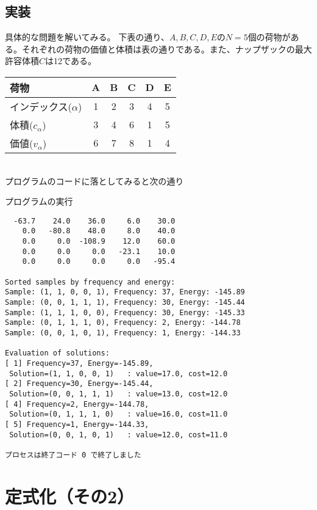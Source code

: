 \documentclass[uplatex,dvipdfmx,a4paper,11pt,oneside,openany]{jsbook}
\begin{document}
\subsection{実装}

具体的な問題を解いてみる。
下表の通り、$A,B,C,D,E$の$N=5$個の荷物がある。それぞれの荷物の価値と体積は表の通りである。また、ナップザックの最大許容体積$C$は12である。\\

\begin{tabular}{|l|ccccc|}\hline
  荷物 & A & B & C & D & E \\\hline
  インデックス($\alpha$) & 1 & 2 & 3 & 4 & 5 \\\hline
  体積($c_\alpha$) & 3 & 4 & 6 & 1 & 5 \\\hline
  価値($v_\alpha$) & 6 & 7 & 8 & 1 & 4 \\\hline
\end{tabular}\\

プログラムのコードに落としてみると次の通り



プログラムの実行

\begin{verbatim}
  -63.7    24.0    36.0     6.0    30.0
    0.0   -80.8    48.0     8.0    40.0
    0.0     0.0  -108.9    12.0    60.0
    0.0     0.0     0.0   -23.1    10.0
    0.0     0.0     0.0     0.0   -95.4

Sorted samples by frequency and energy:
Sample: (1, 1, 0, 0, 1), Frequency: 37, Energy: -145.89
Sample: (0, 0, 1, 1, 1), Frequency: 30, Energy: -145.44
Sample: (1, 1, 1, 0, 0), Frequency: 30, Energy: -145.33
Sample: (0, 1, 1, 1, 0), Frequency: 2, Energy: -144.78
Sample: (0, 0, 1, 0, 1), Frequency: 1, Energy: -144.33

Evaluation of solutions:
[ 1] Frequency=37, Energy=-145.89,
 Solution=(1, 1, 0, 0, 1)	: value=17.0, cost=12.0
[ 2] Frequency=30, Energy=-145.44,
 Solution=(0, 0, 1, 1, 1)	: value=13.0, cost=12.0
[ 4] Frequency=2, Energy=-144.78,
 Solution=(0, 1, 1, 1, 0)	: value=16.0, cost=11.0
[ 5] Frequency=1, Energy=-144.33,
 Solution=(0, 0, 1, 0, 1)	: value=12.0, cost=11.0

プロセスは終了コード 0 で終了しました
\end{verbatim}

\section{定式化（その2）}
\end{document}
